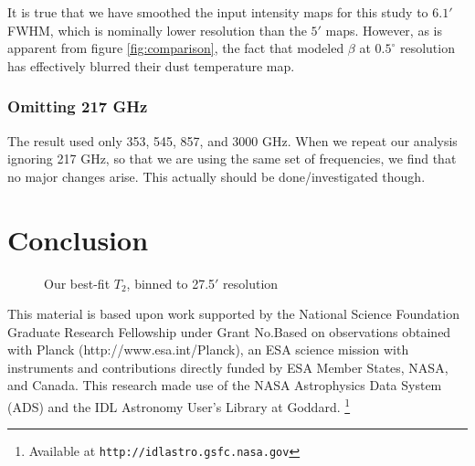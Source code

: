 \documentclass{emulateapj}
\begin{document}
It is true that we have smoothed the input intensity maps for this study 
to $6.1'$ FWHM, which is nominally lower resolution than the $5'$ 
\cite{planckdust} maps. However, as is apparent from figure 
\ref{fig:comparison}, the fact that \cite{planckdust} modeled $\beta$ at 
$0.5^{\circ}$ resolution has effectively blurred their dust temperature map.


\subsubsection{Omitting 217 GHz}
The \cite{planckdust} result used only 353, 545, 857, and 3000 GHz. When we 
repeat our analysis ignoring 217 GHz, so that we are using the same
set of frequencies, we find that no major changes arise. This actually
should be done/investigated though.

\section{Conclusion}
\label{sec:conclusion}

\begin{figure*} [ht]
\begin{center}
\caption{Our best-fit $T_2$, binned to 27.5$'$ resolution}
\end{center}
\end{figure*}

This material is based upon work supported by the National Science Foundation 
Graduate Research Fellowship under Grant No.Based on observations obtained with
 Planck (http://www.esa.int/Planck), an ESA science mission with instruments 
and contributions directly funded by ESA Member States, NASA, and Canada. This 
research made use of the NASA Astrophysics Data System (ADS) and the IDL 
Astronomy User's Library at Goddard. \footnote{Available at 
\texttt{http://idlastro.gsfc.nasa.gov}}



\end{document}

